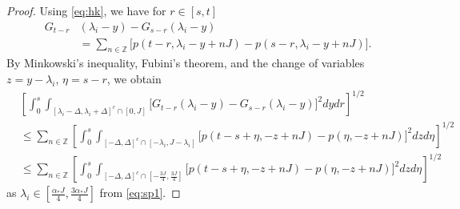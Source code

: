 \documentclass[12pt]{amsart}
\numberwithin{equation}{section}
\theoremstyle{definition}
\numberwithin{equation}{section}
\newcommand{\Z}{\mathbb{Z}}
\begin{document}
\begin{proof} 
Using \eqref{eq:hk}, we have for $r \in [s,t]$
\begin{align*}
G_{t-r}&(\lambda_i-y)-G_{s-r}(\lambda_i-y)  \\
& = \sum_{n\in \Z}\Big[p(t-r,{\lambda}_i-y+nJ) - p(s-r,{\lambda}_i-y+nJ) \Big].
\end{align*}
By Minkowski's inequality, Fubini's theorem, and
the change of variables $z=y-\lambda_i$, $\eta=s-r$, we obtain
\begin{equation} \label{eq:sum_n}
\begin{split}
&\left[\int_{0}^{s}\int_{[\lambda_i-\Delta,\lambda_i+\Delta]^c\cap[0,J]}
  \Big[ G_{t-r}(\lambda_i-y)-G_{s-r}(\lambda_i-y) \Big]^2dydr\right]^{1/2} \\
&\le \sum_{n\in\mathbb{Z}} \left[\int_{0}^{s}
    \int_{[-\Delta,\Delta]^c\cap[-\lambda_i,J-\lambda_i]}
    \Big[p(t-s +\eta,-z+nJ)-p(\eta,-z+nJ)\Big]^2dzd\eta\right]^{1/2}  \\
&\le \sum_{n\in\mathbb{Z}} \left[\int_{0}^{s}
    \int_{[-\Delta,\Delta]^c\cap\left[-\frac{3J}{4},\frac{3J}{4}\right]}
    \Big[p(t-s +\eta,-z+nJ)-p(\eta,-z+nJ)\Big]^2dzd\eta\right]^{1/2} 
\end{split}
\end{equation}
as $\lambda_i\in[\frac{\alpha_*J}{4},\frac{3\alpha_*J}{4}]$ from
\eqref{eq:sp1}.


\end{proof}
\end{document}
